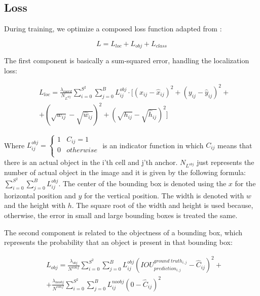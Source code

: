\subsection{Loss}
    During training, we optimize a composed loss function adapted from \cite{experincor}: 
    
   \begin{equation*}
        L = L_{loc} + L_{obj} + L_{class}
        \label{total_loss}
    \end{equation*}
    
    The first component is basically a sum-squared error, handling the localization loss: 
    
    \begin{equation*}
    \begin{split}
        & L_{loc} = \frac{\lambda_{coord}}{N_{L^{obj}}}
        \sum_{i=0}^{S^2}\sum_{j=0}^B 
        L_{ij}^{obj} 
         \cdot [(x_{ij}-\hat{x}_{ij})^2 + 
        (y_{ij}-\hat{y}_{ij})^2 +\\
        & + (\sqrt{w_{ij}}-\sqrt{\hat{w}_{ij}})^2 + (\sqrt{h_{ij}}-\sqrt{\hat{h}_{ij}})^2 ]
    \end{split}
    \end{equation*}
    
    Where $
    L_{ij}^{obj} = \left\{
        \begin{array}{ll}
              1 & C_{ij} = 1\\
              0 & otherwise\\
        \end{array} 
        \right. 
    $ is an indicator function in which $C_{ij}$ means that there is an actual object in the i'th cell and j'th anchor. $N_{L^{obj}}$ just represents the number of actual object in the image and it is given by the following formula: $\sum_{i=0}^{S^2}\sum_{j=0}^B L_{ij}^{obj}$. The center of the bounding box is denoted using the $x$ for the horizontal position and $y$ for the vertical position. The width is denoted with $w$ and the height with $h$. The square root of the width and height is used because, otherwise, the error in small and large bounding boxes is treated the same.
    
    The second component is related to the objectness of a bounding box, which represents the probability that an object is present in that bounding box:
    
    \begin{equation*}
    \begin{split}
        & L_{obj} = \frac{\lambda_{obj}}{N^{conf}}
        \sum_{i=0}^{S^2}\sum_{j=0}^B
        L_{ij}^{obj}(IOU_{prediction_{i,j}}^{ground\;truth_{i,j}} - \hat{C}_{ij})^2 +\\
        & +\frac{\lambda_{noobj}}{N^{conf}}
        \sum_{i=0}^{S^2}\sum_{j=0}^B
        L_{ij}^{noobj}(0 - \hat{C}_{ij})^2
    \end{split}
    \end{equation*}
        

